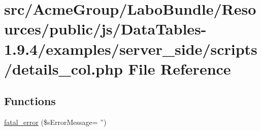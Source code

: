 \hypertarget{details__col_8php}{\section{src/\+Acme\+Group/\+Labo\+Bundle/\+Resources/public/js/\+Data\+Tables-\/1.9.4/examples/server\+\_\+side/scripts/details\+\_\+col.php File Reference}
\label{details__col_8php}
}
\subsection*{Functions}
\begin{DoxyCompactItemize}
\item 
\hyperlink{details__col_8php_a1bb235f2e57f0389e14b11592d32119a}{fatal\+\_\+error} (\$s\+Error\+Message= '')
\end{DoxyCompactItemize}
